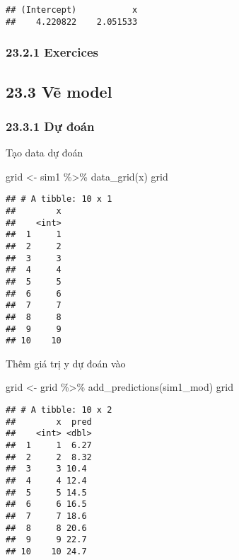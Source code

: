 \documentclass[
]{article}
\newenvironment{Shaded}{\begin{snugshade}}{\end{snugshade}}
\newcommand{\FunctionTok}[1]{\textcolor[rgb]{0.00,0.00,0.00}{#1}}
\newcommand{\NormalTok}[1]{#1}
\newcommand{\OtherTok}[1]{\textcolor[rgb]{0.56,0.35,0.01}{#1}}
\newcommand{\SpecialCharTok}[1]{\textcolor[rgb]{0.00,0.00,0.00}{#1}}
\begin{document}
\begin{verbatim}
## (Intercept)           x 
##    4.220822    2.051533
\end{verbatim}

\hypertarget{exercices}{%
\subsubsection{23.2.1 Exercices}\label{exercices}}

\hypertarget{vux1ebd-model}{%
\subsection{23.3 Vẽ model}\label{vux1ebd-model}}

\hypertarget{dux1ef1-ux111ouxe1n}{%
\subsubsection{23.3.1 Dự đoán}\label{dux1ef1-ux111ouxe1n}}

Tạo data dự đoán

\begin{Shaded}
\begin{Highlighting}[]
\NormalTok{grid }\OtherTok{\textless{}{-}}\NormalTok{ sim1 }\SpecialCharTok{\%\textgreater{}\%}
  \FunctionTok{data\_grid}\NormalTok{(x)}
\NormalTok{grid}
\end{Highlighting}
\end{Shaded}

\begin{verbatim}
## # A tibble: 10 x 1
##        x
##    <int>
##  1     1
##  2     2
##  3     3
##  4     4
##  5     5
##  6     6
##  7     7
##  8     8
##  9     9
## 10    10
\end{verbatim}

Thêm giá trị y dự đoán vào

\begin{Shaded}
\begin{Highlighting}[]
\NormalTok{grid }\OtherTok{\textless{}{-}}\NormalTok{ grid }\SpecialCharTok{\%\textgreater{}\%} 
  \FunctionTok{add\_predictions}\NormalTok{(sim1\_mod) }
\NormalTok{grid}
\end{Highlighting}
\end{Shaded}

\begin{verbatim}
## # A tibble: 10 x 2
##        x  pred
##    <int> <dbl>
##  1     1  6.27
##  2     2  8.32
##  3     3 10.4 
##  4     4 12.4 
##  5     5 14.5 
##  6     6 16.5 
##  7     7 18.6 
##  8     8 20.6 
##  9     9 22.7 
## 10    10 24.7
\end{verbatim}
\end{document}
